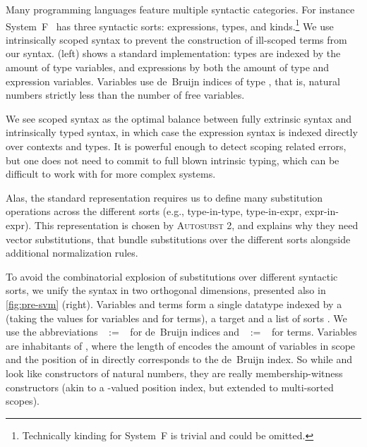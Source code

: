 \documentclass[a4paper,UKenglish,cleveref, autoref, thm-restate,anonymous]{lipics-v2021}
\begin{document}
Many programming languages feature multiple syntactic categories. For instance
System~F~\cite{girard1972, 10.1007/3-540-06859-7_148} has three syntactic
sorts: expressions, types, and kinds.\footnote{Technically kinding for
System~F is trivial and could be omitted.} We use intrinsically scoped syntax to
prevent the construction of ill-scoped terms from our syntax.
 (left) shows a standard implementation: types are indexed by
the amount of type variables, and expressions by both the amount of type and
expression variables. Variables use de~Bruijn indices of type
 , that is, natural numbers strictly less than
the number of free variables.

We see scoped syntax as the optimal balance between fully extrinsic syntax and
intrinsically typed syntax, in which case the expression syntax is indexed
directly over contexts and types. It is powerful enough to detect scoping
related errors, but one does not need to commit to full blown intrinsic typing,
which can be difficult to work with for more complex systems.

Alas, the standard representation requires us to define many substitution
operations across the different sorts (e.g., type-in-type, type-in-expr,
expr-in-expr). This representation is chosen by \textsc{Autosubst 2}, and
explains why they need vector substitutions, that bundle substitutions over the
different sorts alongside additional normalization rules.

To avoid the combinatorial explosion of substitutions over different syntactic
sorts, we unify the syntax in two orthogonal dimensions, presented also in
\cref{fig:pre-svm} (right). Variables and terms form a single datatype
 \AgdaDatatype{⊢[}  \AgdaDatatype{]} 
indexed by a   (taking the values
 for variables and  for
terms), a target   and a list of sorts
 . We use the abbreviations
  ~$\mathrel{:=}$~
\AgdaDatatype{⊢[}  \AgdaDatatype{]} 
for de~Bruijn indices and   ~$\mathrel{:=}$~
\AgdaDatatype{⊢[}  \AgdaDatatype{]} 
for terms. Variables are inhabitants of  
, where the length of  encodes the amount of
variables in scope and the position of  in  directly
corresponds to the de~Bruijn index. So while  and
 look like constructors of natural numbers, they
are really membership-witness constructors (akin to a -valued
position index, but extended to multi-sorted scopes).
\end{document}
